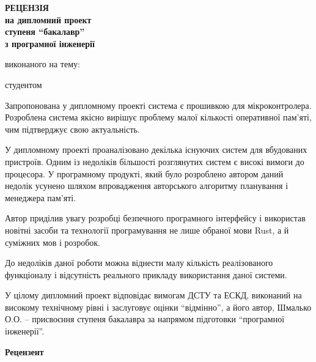 \documentclass[main.tex]{subfiles}
\begin{document}
\begin{otherspecialpage}
  \begin{singlespacing}
  \begin{center}
    \textbf{
      {\large РЕЦЕНЗІЯ}\\
      на дипломний проект\\
      ступеня ``бакалавр''\\
      з програмної інженерії
    }\\
  \end{center}

  \noindent виконаного на тему: 

  \noindent студентом \fillinline{}\\\vspace{5mm}
  \end{singlespacing}


  Запропонована у дипломному проекті система є прошивкою для мікроконтролера. Розроблена система якісно вирішує проблему малої кількості оперативної пам'яті, чим підтверджує свою актуальність.

У дипломному проекті проаналізовано декілька існуючих систем для вбудованих пристроїв. Одним із недоліків більшості розглянутих систем є високі вимоги до процесора. У програмному продукті, який було розроблено автором даний недолік усунено шляхом впровадження авторського алгоритму планування і менеджера пам'яті.

Автор приділив увагу розробці безпечного програмного інтерфейсу і використав новітні засоби та технології програмування не лише обраної мови Rust, а й суміжних мов і розробок.

До недоліків даної роботи можна віднести малу кількість реалізованого функціоналу і відсутність реального прикладу використання даної системи.

У цілому дипломний проект відповідає вимогам ДСТУ та ЕСКД, виконаний на високому технічному рівні і заслуговує оцінки ``відмінно'', а його автор, Шмалько О.О. -- присвоєння ступеня бакалавра за напрямом підготовки ``програмної інженерії''.

  \vfill

  \noindent
  \textbf{Рецензент}\\
  \hfill
  \fillin[(підпис)]{\hspace{22mm}}
  \hfill

  \vfill

\end{otherspecialpage}
\end{document}
